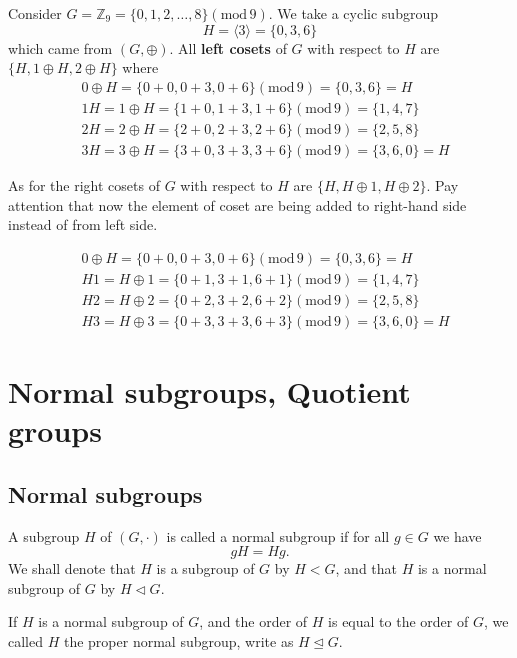 \begin{example}
    Consider $G = \mathbb{Z}_9 = \{ 0, 1, 2, \ldots, 8 \} (\text{mod} \, 9)$. We take a cyclic subgroup 
    \[H = \langle 3 \rangle = \{0, 3, 6\}\] 
    which came from $(G, \oplus)$. All \textbf{left cosets} of $G$ with respect to $H$ are $\{ H, 1 \oplus H, 2 \oplus H \}$ where
    \begin{align*}
        &0 \oplus H = \{0 + 0, 0+ 3, 0 + 6\} (\text{mod} \, 9) = \{0, 3, 6\} = H\\
        &1H = 1 \oplus H = \{1 + 0, 1 + 3, 1 + 6\} (\text{mod} \, 9) = \{1, 4, 7\}\\
        &2H = 2 \oplus H = \{2 + 0, 2 + 3, 2 + 6\} (\text{mod} \, 9) = \{2, 5, 8\}\\
        &3H = 3 \oplus H = \{3 + 0, 3 + 3, 3 + 6\} (\text{mod} \, 9) = \{3, 6, 0\} = H
    \end{align*}

    As for the right cosets of $G$ with respect to $H$ are $\{ H, H \oplus 1, H \oplus 2 \}$. Pay attention that now the element of coset are being 
    added to right-hand side instead of from left side.

    \begin{align*}
        &0 \oplus H = \{0 + 0, 0+ 3, 0 + 6\} (\text{mod} \, 9) = \{0, 3, 6\} = H\\
        &H1 = H \oplus 1 = \{0 + 1, 3 + 1, 6 + 1\} (\text{mod} \, 9) = \{1, 4, 7\}\\
        &H2 = H \oplus 2 = \{0 + 2, 3 + 2, 6 + 2\} (\text{mod} \, 9) = \{2, 5, 8\}\\
        &H3 = H \oplus 3 = \{0 + 3, 3 + 3, 6 + 3\} (\text{mod} \, 9) = \{3, 6, 0\} = H
    \end{align*}
\end{example}

\section{Normal subgroups, Quotient groups}

\subsection{Normal subgroups}

\begin{definition}
    A subgroup $H$ of $(G, \cdot)$ is called a normal subgroup if for all $g \in G$ we have 
    \begin{equation}
        gH = Hg.
    \end{equation}
    We shall denote that $H$ is a subgroup of $G$ by $H < G$, and that $H$ is a normal subgroup of $G$ 
    by $H \vartriangleleft G$. 
    
    If $H$ is a normal subgroup of $G$, and the order of $H$ is equal to the order of $G$, we called $H$ the proper normal subgroup, write as $H \trianglelefteq G$. 
\end{definition}

